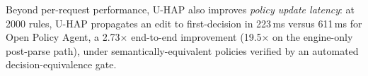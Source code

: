 

Beyond per-request performance, U-HAP also improves \emph{policy update
latency}: at 2000 rules, U-HAP propagates an edit to first-decision
in 223\,ms versus 611\,ms for Open Policy Agent, a 2.73$\times$
end-to-end improvement (19.5$\times$ on the engine-only post-parse
path), under semantically-equivalent policies verified by an automated
decision-equivalence gate.
